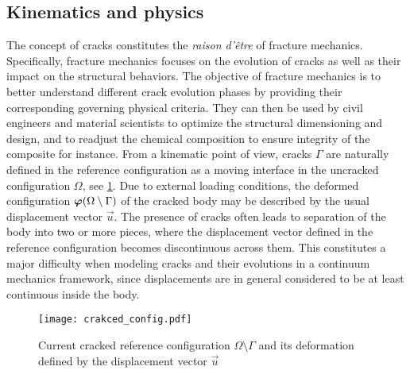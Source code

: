 \subsection{Kinematics and physics} \label{sec:kinematics}
The concept of cracks constitutes the \emph{raison d'être} of fracture mechanics. Specifically, fracture mechanics focuses on the evolution of cracks as well as their impact on the structural behaviors. The objective of fracture mechanics is to better understand different crack evolution phases by providing their corresponding governing physical criteria. They can then be used by civil engineers and material scientists to optimize the structural dimensioning and design, and to readjust the chemical composition to ensure integrity of the composite for instance. From a kinematic point of view, cracks $\Gamma$ are naturally defined in the reference configuration as a moving interface in the uncracked configuration $\Omega$, see \cref{fig:crackedconfig}. Due to external loading conditions, the deformed configuration $\vphi(\Omega\setminus\Gamma)$ of the cracked body may be described by the usual displacement vector $\vec{u}$. The presence of cracks often leads to separation of the body into two or more pieces, where the displacement vector defined in the reference configuration becomes discontinuous across them. This constitutes a major difficulty when modeling cracks and their evolutions in a continuum mechanics framework, since displacements are in general considered to be at least continuous inside the body.
\begin{figure}[htbp]
\centering
\texttt{[image: crakced\_config.pdf]}
\caption{Current cracked reference configuration $\Omega\setminus\Gamma$ and its deformation defined by the displacement vector $\vec{u}$} \label{fig:crackedconfig}
\end{figure}

